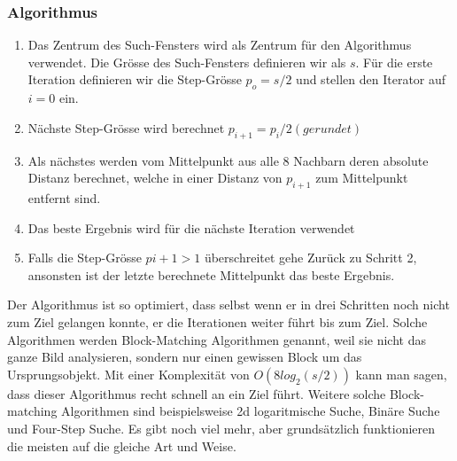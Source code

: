 \subsubsection{Algorithmus}
\begin{enumerate}
\item Das Zentrum des Such-Fensters wird als Zentrum für den Algorithmus verwendet. Die Grösse des Such-Fensters definieren wir als $s$. Für die erste Iteration definieren wir die Step-Grösse $p_o = s/2$ und stellen den Iterator  auf $i = 0$ ein.
\item Nächste Step-Grösse wird berechnet $p_{i+1} = p_i/2(gerundet)$
\item Als nächstes werden vom Mittelpunkt aus alle 8 Nachbarn deren absolute Distanz berechnet, welche in einer Distanz von $p_{i+1}$ zum Mittelpunkt entfernt sind.
\item Das beste Ergebnis wird für die nächste Iteration verwendet
\item Falls die Step-Grösse $p{i+1} >1$ überschreitet gehe Zurück zu Schritt 2, ansonsten ist der letzte berechnete Mittelpunkt das beste Ergebnis.
\end{enumerate}

Der Algorithmus ist so optimiert, dass selbst wenn er in drei Schritten noch nicht zum Ziel gelangen konnte, er die Iterationen weiter führt bis zum Ziel. Solche Algorithmen werden Block-Matching Algorithmen genannt, weil sie nicht das ganze Bild analysieren, sondern nur einen gewissen Block um das Ursprungsobjekt. Mit einer Komplexität von $ O(8log_2(s/2))$ kann man sagen, dass dieser Algorithmus recht schnell an ein Ziel führt. Weitere solche Block-matching Algorithmen sind beispielsweise 2d logaritmische Suche, Binäre Suche und Four-Step Suche. Es gibt noch viel mehr, aber grundsätzlich funktionieren die meisten auf die gleiche Art und Weise.
